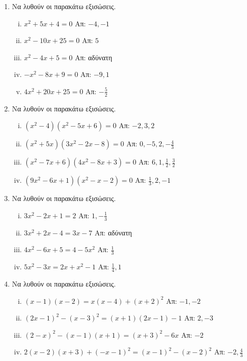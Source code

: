 \documentclass[a4paper,table]{report}
\begin{document}
\begin{enumerate}
  \item  Να λυθούν οι παρακάτω εξισώσεις.
    \begin{enumerate}[i)]
      \item $ x^{2} + 5x + 4 = 0 $ \hfill Απ:  $ -4, -1 $
      \item $ x^{2} - 10x + 25 = 0 $ \hfill Απ: $ 5 $
      \item $ x^{2} - 4x + 5 = 0 $ \hfill Απ:  αδύνατη
      \item $ -x^{2} - 8x + 9 = 0 $ \hfill Απ: $ -9, 1 $
      \item $ 4x^{2} + 20x + 25 = 0 $ \hfill Απ: $ - \frac{5}{2} $ 
    \end{enumerate}

  \item Να λυθούν οι παρακάτω εξισώσεις.
    \begin{enumerate}[i)]
      \item $ (x^{2} - 4)(x^{2} - 5x + 6) = 0 $ \hfill Απ: $ -2, 3, 2 $ 
      \item $ (x^{2} + 5x)(3x^{2} - 2x - 8) = 0 $ \hfill Απ: $ 0, -5, 2, -\frac{4}{3} $
      \item $ (x^{2} - 7x + 6)(4x^{2}- 8x + 3) = 0 $ \hfill Απ: $ 6, 1, \frac{1}{2},
        \frac{3}{2} $
      \item $ (9x^{2} - 6x + 1)(x^{2} - x - 2) = 0 $ \hfill Απ: $ \frac{1}{3}, 2, -1  $ 
    \end{enumerate}

  \item Να λυθούν οι παρακάτω εξισώσεις.
    \begin{enumerate}[i)]
      \item $ 3x^{2} - 2x + 1 = 2 $ \hfill Απ: $ 1, - \frac{1}{3} $  
      \item $ 3x^{2} + 2x - 4 = 3x - 7 $ \hfill Απ:  αδύνατη
      \item $ 4x^{2} - 6x + 5 = 4 - 5x^{2} $ \hfill Απ: $ \frac{1}{3} $
      \item $ 5x^{2} - 3x = 2x + x^{2} - 1 $ \hfill Απ: $ \frac{1}{4}, 1 $ 
    \end{enumerate}

  \item Να λυθούν οι παρακάτω εξισώσεις.
    \begin{enumerate}[i)]
      \item $ (x-1)(x-2) = x(x-4)+(x+2)^{2} $ \hfill Απ: $ -1, -2 $
      \item $ (2x-1)^{2} - (x-3)^{2} = (x+1)(2x-1) - 1 $ \hfill Απ: $ 2, -3 $
      \item $ (2-x)^{2} - (x-1)(x+1) = (x+3)^{2} - 6x $ \hfill Απ: $ -2 $
      \item $ 2(x-2)(x+3) + (-x-1)^{2} = (x-1)^{2} - (x-2)^{2} $ \hfill Απ: $ -2,
        \frac{4}{3} $ 
    \end{enumerate}


\end{enumerate}
\end{document}
